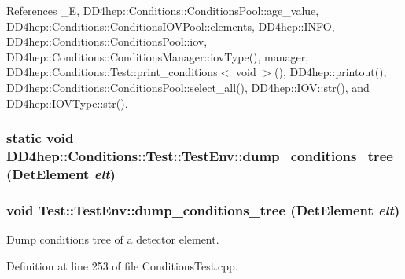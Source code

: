References \_\-E, DD4hep::Conditions::ConditionsPool::age\_\-value, DD4hep::Conditions::ConditionsIOVPool::elements, DD4hep::INFO, DD4hep::Conditions::ConditionsPool::iov, DD4hep::Conditions::ConditionsManager::iovType(), manager, DD4hep::Conditions::Test::print\_\-conditions$<$ void $>$(), DD4hep::printout(), DD4hep::Conditions::ConditionsPool::select\_\-all(), DD4hep::IOV::str(), and DD4hep::IOVType::str().\hypertarget{struct_d_d4hep_1_1_conditions_1_1_test_1_1_test_env_a1cabe62789776e1356609988fcb03442}{
\subsubsection[{dump\_\-conditions\_\-tree}]{\setlength{\rightskip}{0pt plus 5cm}static void DD4hep::Conditions::Test::TestEnv::dump\_\-conditions\_\-tree ({\bf DetElement} {\em elt})}}
\label{struct_d_d4hep_1_1_conditions_1_1_test_1_1_test_env_a1cabe62789776e1356609988fcb03442}
\hypertarget{struct_d_d4hep_1_1_conditions_1_1_test_1_1_test_env_ad3463aa0bb52943b896e9410019d4a5f}{
\subsubsection[{dump\_\-conditions\_\-tree}]{\setlength{\rightskip}{0pt plus 5cm}void Test::TestEnv::dump\_\-conditions\_\-tree ({\bf DetElement} {\em elt})}}
\label{struct_d_d4hep_1_1_conditions_1_1_test_1_1_test_env_ad3463aa0bb52943b896e9410019d4a5f}


Dump conditions tree of a detector element. 

Definition at line 253 of file ConditionsTest.cpp.

